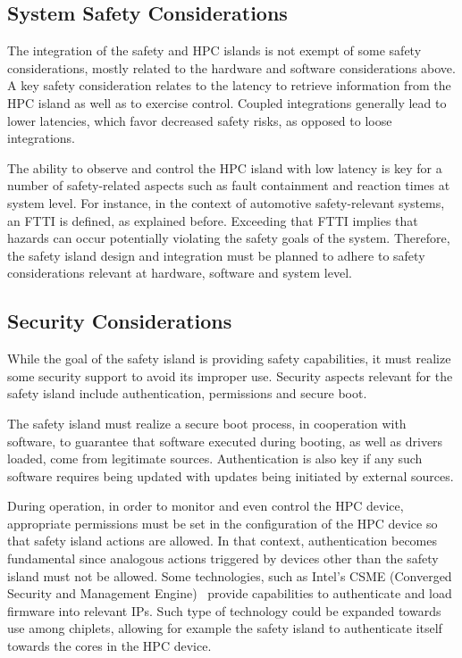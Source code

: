 \subsection{System Safety Considerations}
The integration of the safety and HPC islands is not exempt of some safety considerations, mostly related to the hardware and software considerations above. A key safety consideration relates to the latency to retrieve information from the HPC island as well as to exercise control. Coupled integrations generally lead to lower latencies, which favor decreased safety risks, as opposed to loose integrations. 

The ability to observe and control the HPC island with low latency is key for a number of safety-related aspects such as fault containment and reaction times at system level. For instance, in the context of automotive safety-relevant systems, an FTTI is defined, as explained before. Exceeding that FTTI implies that hazards can occur potentially violating the safety goals of the system. Therefore, the safety island design and integration must be planned to adhere to safety considerations relevant at hardware, software and system level.


\subsection{Security Considerations}
\label{sec:seccons}

{\color{black}While the goal of the safety island is providing safety capabilities, it must realize some security support to avoid its improper use. Security aspects relevant for the safety island include authentication, permissions and secure boot.

The safety island must realize a secure boot process, in cooperation with software, to guarantee that software executed during booting, as well as drivers loaded, come from legitimate sources. Authentication is also key if any such software requires being updated with updates being initiated by external sources.

During operation, in order to monitor and even control the HPC device, appropriate permissions must be set in the configuration of the HPC device so that safety island actions are allowed. In that context, authentication becomes fundamental since analogous actions triggered by devices other than the safety island must not be allowed. 
Some technologies, such as Intel’s CSME (Converged Security and Management Engine)~\cite{SAI} provide capabilities to authenticate and load firmware into relevant IPs. Such type of technology could be expanded towards use among chiplets, allowing for example the safety island to authenticate itself towards the cores in the HPC device.
}

